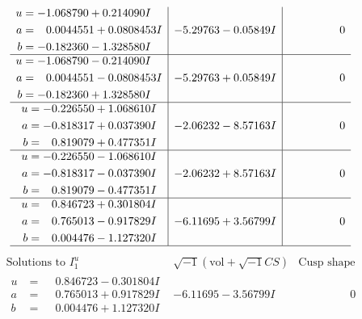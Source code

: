 \documentclass[1p]{elsarticle_modified}
\theoremstyle{definition}
\newcommand{\I}{\sqrt{-1}}
\begin{document}
$$\begin{array}{c|c|c}
\begin{aligned}
u &= -1.068790 + 0.214090 I \\
a &= \phantom{-}0.0044551 + 0.0808453 I \\
b &= -0.182360 - 1.328580 I\end{aligned}
 & -5.29763 - 0.05849 I & \phantom{-0.000000 } 0 \\ \hline\begin{aligned}
u &= -1.068790 - 0.214090 I \\
a &= \phantom{-}0.0044551 - 0.0808453 I \\
b &= -0.182360 + 1.328580 I\end{aligned}
 & -5.29763 + 0.05849 I & \phantom{-0.000000 } 0 \\ \hline\begin{aligned}
u &= -0.226550 + 1.068610 I \\
a &= -0.818317 + 0.037390 I \\
b &= \phantom{-}0.819079 + 0.477351 I\end{aligned}
 & -2.06232 - 8.57163 I & \phantom{-0.000000 } 0 \\ \hline\begin{aligned}
u &= -0.226550 - 1.068610 I \\
a &= -0.818317 - 0.037390 I \\
b &= \phantom{-}0.819079 - 0.477351 I\end{aligned}
 & -2.06232 + 8.57163 I & \phantom{-0.000000 } 0 \\ \hline\begin{aligned}
u &= \phantom{-}0.846723 + 0.301804 I \\
a &= \phantom{-}0.765013 - 0.917829 I \\
b &= \phantom{-}0.004476 - 1.127320 I\end{aligned}
 & -6.11695 + 3.56799 I & \phantom{-0.000000 } 0\\
 \hline 
 \end{array}$$\newpage$$\begin{array}{c|c|c}  
\text{Solutions to }I^u_{1}& \I (\text{vol} + \sqrt{-1}CS) & \text{Cusp shape}\\
 \hline 
\begin{aligned}
u &= \phantom{-}0.846723 - 0.301804 I \\
a &= \phantom{-}0.765013 + 0.917829 I \\
b &= \phantom{-}0.004476 + 1.127320 I\end{aligned}
 & -6.11695 - 3.56799 I & \phantom{-0.000000 } 0 \\ \hline\begin{aligned}

\end{aligned}
\end{array}$$
\end{document}
